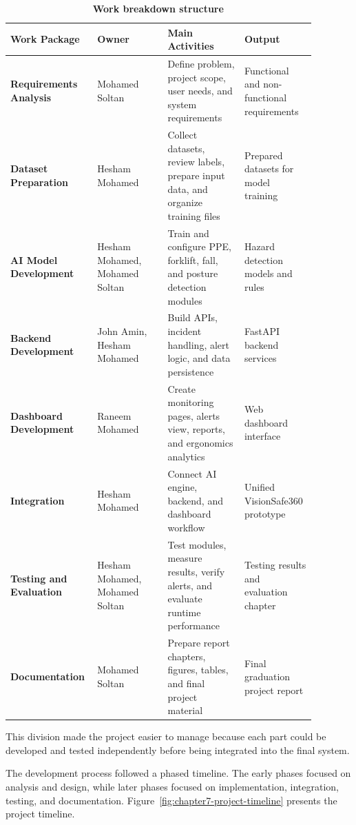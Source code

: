 \begin{table}[H]
\centering
\renewcommand{\arraystretch}{1.55}
\footnotesize
\begin{tabular}{|>{\centering\arraybackslash}p{0.2\linewidth}|>{\centering\arraybackslash}p{0.22\linewidth}|>{\centering\arraybackslash}p{0.24\linewidth}|>{\centering\arraybackslash}p{0.22\linewidth}|}
\hline
\textbf{Work Package} & \textbf{Owner} & \textbf{Main Activities} & \textbf{Output} \\
\hline
\textbf{Requirements Analysis} & Mohamed Soltan & Define problem, project scope, user needs, and system requirements & Functional and non-functional requirements \\
\hline
\textbf{Dataset Preparation} & Hesham Mohamed & Collect datasets, review labels, prepare input data, and organize training files & Prepared datasets for model training \\
\hline
\textbf{AI Model Development} & Hesham Mohamed, Mohamed Soltan & Train and configure PPE, forklift, fall, and posture detection modules & Hazard detection models and rules \\
\hline
\textbf{Backend Development} & John Amin, Hesham Mohamed & Build APIs, incident handling, alert logic, and data persistence & FastAPI backend services \\
\hline
\textbf{Dashboard Development} & Raneem Mohamed & Create monitoring pages, alerts view, reports, and ergonomics analytics & Web dashboard interface \\
\hline
\textbf{Integration} & Hesham Mohamed & Connect AI engine, backend, and dashboard workflow & Unified VisionSafe360 prototype \\
\hline
\textbf{Testing and Evaluation} & Hesham Mohamed, Mohamed Soltan & Test modules, measure results, verify alerts, and evaluate runtime performance & Testing results and evaluation chapter \\
\hline
\textbf{Documentation} & Mohamed Soltan & Prepare report chapters, figures, tables, and final project material & Final graduation project report \\
\hline
\end{tabular}
\caption{\textbf{Work breakdown structure}}
\label{tab:chapter7-wbs}
\end{table}

This division made the project easier to manage because each part could be developed and tested independently before being integrated into the final system.

The development process followed a phased timeline. The early phases focused on analysis and design, while later phases focused on implementation, integration, testing, and documentation. Figure~\ref{fig:chapter7-project-timeline} presents the project timeline.

